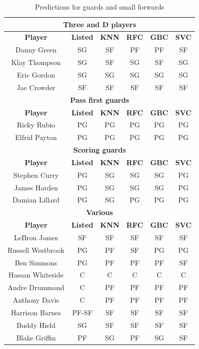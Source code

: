 \documentclass[a4paper]{article}
\begin{document}
\begin{table}[!h]
\begin{center}
\begin{tabular}{|c|c|c|c|c|c|} \hline
\multicolumn{6}{|c|}{\textbf{Three and D players}} \\ \hline
\textbf{Player} & \textbf{Listed} & \textbf{KNN} & \textbf{RFC} & \textbf{GBC} & \textbf{SVC} \\ \hline
Danny Green & SG & SF & PF & PF & SF \\ \hline
Klay Thompson & SG & SF & SG & SF & SG  \\ \hline
Eric Gordon & SG & SG & SG & SG & SG  \\ \hline
Jae Crowder & SF & SF & SF & SF & SF  \\ \hline
\multicolumn{6}{|c|}{\textbf{Pass first guards}} \\ \hline
\textbf{Player} & \textbf{Listed} & \textbf{KNN} & \textbf{RFC} & \textbf{GBC} & \textbf{SVC} \\ \hline
Ricky Rubio & PG & PG & PG & PG & PG \\ \hline
Elfrid Payton & PG & PG & PG & PG & PG \\ \hline
\multicolumn{6}{|c|}{\textbf{Scoring guards}} \\ \hline
\textbf{Player} & \textbf{Listed} & \textbf{KNN} & \textbf{RFC} & \textbf{GBC} & \textbf{SVC} \\ \hline
Stephen Curry & PG & SG & SG & SG & PG  \\ \hline
James Harden & PG & SG & SG & SG & PG \\ \hline
Damian Lillard & PG & SG & PG & PG & PG \\ \hline
\multicolumn{6}{|c|}{\textbf{Various}} \\ \hline
\textbf{Player} & \textbf{Listed} & \textbf{KNN} & \textbf{RFC} & \textbf{GBC} & \textbf{SVC} \\ \hline
LeBron James & SF & SF & SF & SF & SF \\ \hline
Russell Westbrook & PG & PF & SF & PG & PG \\ \hline
Ben Simmons & PG & PF & PF & PF & SF \\ \hline
Hassan Whiteside & C & C & C & C & C \\ \hline
Andre Drummond & C & PF & PF & PF & PF \\ \hline
Anthony Davis & C & PF & PF & PF & PF \\ \hline
Harrison Barnes & PF-SF & SF & SF & SF & SF \\ \hline
Buddy Hield & SG & SF & SF & SF & SF \\ \hline
Blake Griffin & PF & SG & PF & SG & SF \\ \hline
\end{tabular}
\caption{Predictions for guards and small forwards}
\label{tab:pos_clf_pg_sg_sf_predictions}
\end{center}
\end{table}
\end{document}
